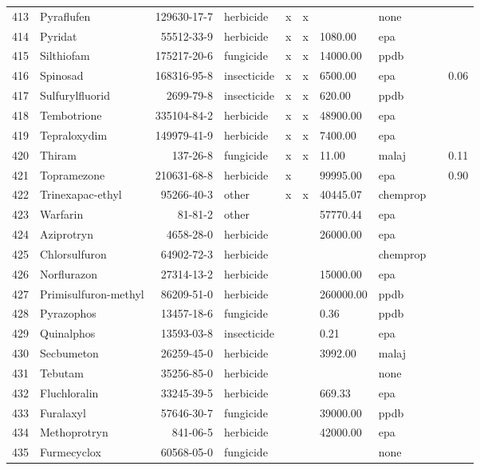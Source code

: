 \begin{longtable}{lp{3cm}rlp{0.5cm}p{0.5cm}p{1cm}p{1cm}p{1cm}p{1cm}}
  413 & Pyraflufen & 129630-17-7 & herbicide & x & x &  & none &  &  \\ 
  414 & Pyridat & 55512-33-9 & herbicide & x & x & 1080.00 & epa &  &  \\ 
  415 & Silthiofam & 175217-20-6 & fungicide & x & x & 14000.00 & ppdb &  &  \\ 
  416 & Spinosad & 168316-95-8 & insecticide & x & x & 6500.00 & epa &  & 0.06 \\ 
  417 & Sulfurylfluorid & 2699-79-8 & insecticide & x & x & 620.00 & ppdb &  &  \\ 
  418 & Tembotrione & 335104-84-2 & herbicide & x & x & 48900.00 & epa &  &  \\ 
  419 & Tepraloxydim & 149979-41-9 & herbicide & x & x & 7400.00 & epa &  &  \\ 
  420 & Thiram & 137-26-8 & fungicide & x & x & 11.00 & malaj &  & 0.11 \\ 
  421 & Topramezone & 210631-68-8 & herbicide & x &  & 99995.00 & epa &  & 0.90 \\ 
  422 & Trinexapac-ethyl & 95266-40-3 & other & x & x & 40445.07 & chemprop &  &  \\ 
  423 & Warfarin & 81-81-2 & other &  &  & 57770.44 & epa &  &  \\ 
  424 & Aziprotryn & 4658-28-0 & herbicide &  &  & 26000.00 & epa &  &  \\ 
  425 & Chlorsulfuron & 64902-72-3 & herbicide &  &  &  & chemprop &  &  \\ 
  426 & Norflurazon & 27314-13-2 & herbicide &  &  & 15000.00 & epa &  &  \\ 
  427 & Primisulfuron-methyl & 86209-51-0 & herbicide &  &  & 260000.00 & ppdb &  &  \\ 
  428 & Pyrazophos & 13457-18-6 & fungicide &  &  & 0.36 & ppdb &  &  \\ 
  429 & Quinalphos & 13593-03-8 & insecticide &  &  & 0.21 & epa &  &  \\ 
  430 & Secbumeton & 26259-45-0 & herbicide &  &  & 3992.00 & malaj &  &  \\ 
  431 & Tebutam & 35256-85-0 & herbicide &  &  &  & none &  &  \\ 
  432 & Fluchloralin & 33245-39-5 & herbicide &  &  & 669.33 & epa &  &  \\ 
  433 & Furalaxyl & 57646-30-7 & fungicide &  &  & 39000.00 & ppdb &  &  \\ 
  434 & Methoprotryn & 841-06-5 & herbicide &  &  & 42000.00 & epa &  &  \\ 
  435 & Furmecyclox & 60568-05-0 & fungicide &  &  &  & none &  &  \\ 

\end{longtable}
